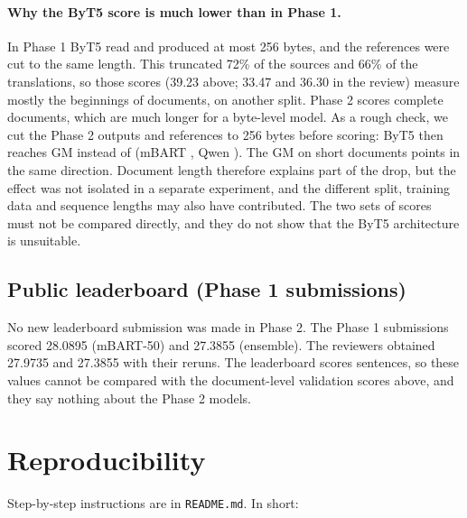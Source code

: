 \documentclass[a4paper,12pt]{article}
\begin{document}
\paragraph{Why the ByT5 score is much lower than in Phase 1.}
In Phase 1 ByT5 read and produced at most 256 bytes, and the references were cut to the same length. This truncated 72\% of the sources and 66\% of the translations, so those scores (39.23 above; 33.47 and 36.30 in the review) measure mostly the beginnings of documents, on another split. Phase 2 scores complete documents, which are much longer for a byte-level model. As a rough check, we cut the Phase 2 outputs and references to 256 bytes before scoring: ByT5 then reaches \BtPrefix{} GM instead of \BtGM{} (mBART \MbPrefix, Qwen \QwPrefix). The \BtShort{} GM on short documents points in the same direction. Document length therefore explains part of the drop, but the effect was not isolated in a separate experiment, and the different split, training data and sequence lengths may also have contributed. The two sets of scores must not be compared directly, and they do not show that the ByT5 architecture is unsuitable.

\subsection{Public leaderboard (Phase 1 submissions)}
No new leaderboard submission was made in Phase 2. The Phase 1 submissions scored 28.0895 (mBART-50) and 27.3855 (ensemble). The reviewers obtained 27.9735 and 27.3855 with their reruns. The leaderboard scores sentences, so these values cannot be compared with the document-level validation scores above, and they say nothing about the Phase 2 models.

\section{Reproducibility}
\label{sec:repro}
Step-by-step instructions are in \texttt{README.md}. In short:
\end{document}
